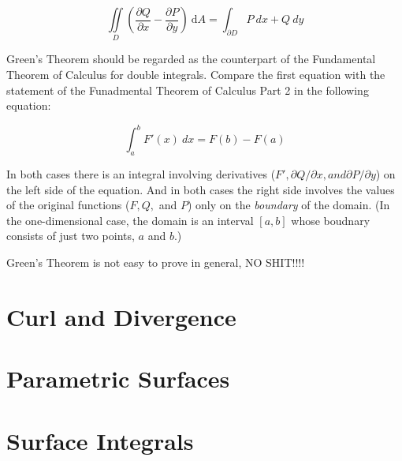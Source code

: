 \documentclass{article}
\begin{document}
\begin{equation*}
    \iint\limits_{D}(\frac{\partial Q}{\partial x} - \frac{\partial P}{\partial y}) \ \mathrm{d}A = \int_{\partial D} P \ dx + Q \ dy
\end{equation*}

Green's Theorem should be regarded as the counterpart of the Fundamental Theorem of Calculus for double integrals. Compare the first equation with the statement of the Funadmental Theorem of Calculus Part 2 in the following equation:

\begin{equation*}
    \int_{a}^{b}F'(x) \ dx = F(b) - F(a)
\end{equation*}

In both cases there is an integral involving derivatives ($F', \partial Q / \partial x, and \partial P / \partial y$) on the left side of the equation. And in both cases the right side involves the values of the original functions ($F, Q,$ and $P$) only on the \textit{boundary} of the domain. (In the one-dimensional case, the domain is an interval $[a,b]$ whose boudnary consists of just two points, $a$ and $b.$)

Green's Theorem is not easy to prove in general, NO SHIT!!!!


\newpage
\section{Curl and Divergence}

\newpage
\section{Parametric Surfaces}

\newpage
\section{Surface Integrals}
\end{document}
